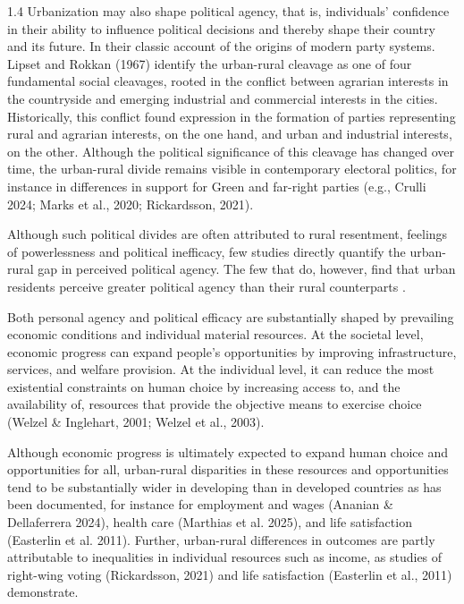 \documentclass[10pt, letterpaper]{article}
\begin{document}
\begin{spacing}{1.4}
Urbanization may also shape political agency, that is, individuals' confidence in their ability to influence political decisions and thereby shape their country and its future. In their classic account of the origins of modern party systems. Lipset and Rokkan (1967) identify the urban-rural cleavage as one of four fundamental social cleavages, rooted in the conflict between agrarian interests in the countryside and emerging industrial and commercial interests in the cities. Historically, this conflict found expression in the formation of parties representing rural and agrarian interests, on the one hand, and urban and industrial interests, on the other. Although the political significance of this cleavage has changed over time, the urban-rural divide remains visible in contemporary electoral politics, for instance in differences in support for Green and far-right parties (e.g., Crulli 2024; Marks et al., 2020; Rickardsson, 2021). 

Although such political divides are often attributed to rural resentment,
feelings of powerlessness and political inefficacy, few studies directly
quantify the urban-rural gap in perceived political agency. The few that do,
however, find that urban residents perceive greater political agency than
their rural counterparts  \citep[e.g,][]{garcia2024they,luukkonen2022urbanisation,rowland2024political}.

Both personal agency and political efficacy are substantially shaped by prevailing economic conditions and individual material resources. At the societal level, economic progress can expand people's opportunities by improving infrastructure, services, and welfare provision. At the individual level, it can reduce the most existential constraints on human choice by increasing access to, and the availability of, resources that provide the objective means to exercise choice (Welzel \& Inglehart, 2001; Welzel et al., 2003). 

Although economic progress is ultimately expected to expand human choice and opportunities for all, urban-rural disparities in these resources and opportunities tend to be substantially wider in developing than in developed countries as has been documented, for instance for employment and wages (Ananian \& Dellaferrera 2024), health care (Marthias et al. 2025), and life satisfaction (Easterlin et al. 2011). Further, urban-rural differences in outcomes are partly attributable to inequalities in individual resources such as income, as studies of right-wing voting (Rickardsson, 2021) and life satisfaction (Easterlin et al., 2011) demonstrate. 
%


\end{spacing}
\end{document}
